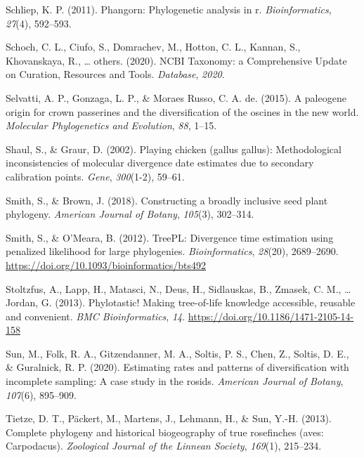 \documentclass[english,man]{apa6}
\begin{document}
\leavevmode\hypertarget{ref-schliep2011phangorn}{}%
Schliep, K. P. (2011). Phangorn: Phylogenetic analysis in r. \emph{Bioinformatics}, \emph{27}(4), 592--593.

\leavevmode\hypertarget{ref-schoch2020ncbi}{}%
Schoch, C. L., Ciufo, S., Domrachev, M., Hotton, C. L., Kannan, S., Khovanskaya, R., \ldots{} others. (2020). NCBI Taxonomy: a Comprehensive Update on Curation, Resources and Tools. \emph{Database}, \emph{2020}.

\leavevmode\hypertarget{ref-selvatti2015paleogene}{}%
Selvatti, A. P., Gonzaga, L. P., \& Moraes Russo, C. A. de. (2015). A paleogene origin for crown passerines and the diversification of the oscines in the new world. \emph{Molecular Phylogenetics and Evolution}, \emph{88}, 1--15.

\leavevmode\hypertarget{ref-shaul2002playing}{}%
Shaul, S., \& Graur, D. (2002). Playing chicken (gallus gallus): Methodological inconsistencies of molecular divergence date estimates due to secondary calibration points. \emph{Gene}, \emph{300}(1-2), 59--61.

\leavevmode\hypertarget{ref-smith2018constructing}{}%
Smith, S., \& Brown, J. (2018). Constructing a broadly inclusive seed plant phylogeny. \emph{American Journal of Botany}, \emph{105}(3), 302--314.

\leavevmode\hypertarget{ref-Smith2012}{}%
Smith, S., \& O'Meara, B. (2012). TreePL: Divergence time estimation using penalized likelihood for large phylogenies. \emph{Bioinformatics}, \emph{28}(20), 2689--2690. \url{https://doi.org/10.1093/bioinformatics/bts492}

\leavevmode\hypertarget{ref-Stoltzfus2013}{}%
Stoltzfus, A., Lapp, H., Matasci, N., Deus, H., Sidlauskas, B., Zmasek, C. M., \ldots{} Jordan, G. (2013). Phylotastic! Making tree-of-life knowledge accessible, reusable and convenient. \emph{BMC Bioinformatics}, \emph{14}. \url{https://doi.org/10.1186/1471-2105-14-158}

\leavevmode\hypertarget{ref-sun2020estimating}{}%
Sun, M., Folk, R. A., Gitzendanner, M. A., Soltis, P. S., Chen, Z., Soltis, D. E., \& Guralnick, R. P. (2020). Estimating rates and patterns of diversification with incomplete sampling: A case study in the rosids. \emph{American Journal of Botany}, \emph{107}(6), 895--909.

\leavevmode\hypertarget{ref-tietze2013complete}{}%
Tietze, D. T., Päckert, M., Martens, J., Lehmann, H., \& Sun, Y.-H. (2013). Complete phylogeny and historical biogeography of true rosefinches (aves: Carpodacus). \emph{Zoological Journal of the Linnean Society}, \emph{169}(1), 215--234.
\end{document}
